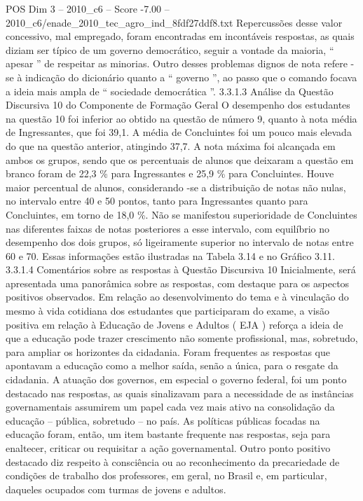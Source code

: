 \begin{textsample}{POS Dim 3 – 2010\_c6 – Score -7.00 – 2010\_c6/enade\_2010\_tec\_agro\_ind\_8fdf27ddf8.txt}
Repercussões desse valor concessivo, mal empregado, foram encontradas em incontáveis respostas, as quais diziam ser típico de um governo democrático, seguir a vontade da maioria, “ apesar ” de respeitar as minorias.
Outro desses problemas dignos de nota refere -se à indicação do dicionário quanto a “ governo ”, ao passo que o comando focava a ideia mais ampla de “ sociedade democrática ”. 3.3.1.3 Análise da Questão Discursiva 10 do Componente de Formação Geral O desempenho dos estudantes na questão 10 foi inferior ao obtido na questão de número 9, quanto à nota média de Ingressantes, que foi 39,1.
A média de Concluintes foi um pouco mais elevada do que na questão anterior, atingindo 37,7.
A nota máxima foi alcançada em ambos os grupos, sendo que os percentuais de alunos que deixaram a questão em branco foram de 22,3 \% para Ingressantes e 25,9 \% para Concluintes.
Houve maior percentual de alunos, considerando -se a distribuição de notas não nulas, no intervalo entre 40 e 50 pontos, tanto para Ingressantes quanto para Concluintes, em torno de 18,0 \%.
Não se manifestou superioridade de Concluintes nas diferentes faixas de notas posteriores a esse intervalo, com equilíbrio no desempenho dos dois grupos, só ligeiramente superior no intervalo de notas entre 60 e 70.
Essas informações estão ilustradas na Tabela 3.14 e no Gráfico 3.11. 3.3.1.4 Comentários sobre as respostas à Questão Discursiva 10 Inicialmente, será apresentada uma panorâmica sobre as respostas, com destaque para os aspectos positivos observados.
Em relação ao desenvolvimento do tema e à vinculação do mesmo à vida cotidiana dos estudantes que participaram do exame, a visão positiva em relação à Educação de Jovens e Adultos ( EJA ) reforça a ideia de que a educação pode trazer crescimento não somente profissional, mas, sobretudo, para ampliar os horizontes da cidadania.
Foram frequentes as respostas que apontavam a educação como a melhor saída, senão a única, para o resgate da cidadania.
A atuação dos governos, em especial o governo federal, foi um ponto destacado nas respostas, as quais sinalizavam para a necessidade de as instâncias governamentais assumirem um papel cada vez mais ativo na consolidação da educação – pública, sobretudo – no país.
As políticas públicas focadas na educação foram, então, um item bastante frequente nas respostas, seja para enaltecer, criticar ou requisitar a ação governamental.
Outro ponto positivo destacado diz respeito à consciência ou ao reconhecimento da precariedade de condições de trabalho dos professores, em geral, no Brasil e, em particular, daqueles ocupados com turmas de jovens e adultos.

\end{textsample}
